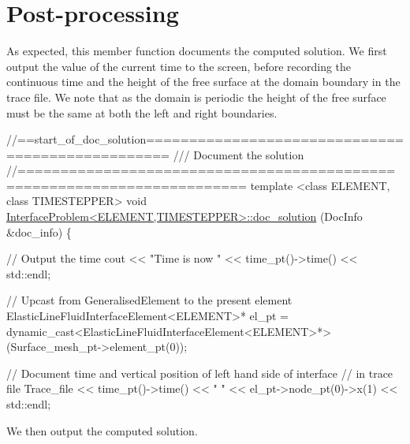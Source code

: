  

\hypertarget{index_doc}{}\section{Post-\/processing}\label{index_doc}
As expected, this member function documents the computed solution. We first output the value of the current time to the screen, before recording the continuous time and the height of the free surface at the domain boundary in the trace file. We note that as the domain is periodic the height of the free surface must be the same at both the left and right boundaries.


\begin{DoxyCodeInclude}
\textcolor{comment}{//==start\_of\_doc\_solution=================================================}
\textcolor{comment}{/// Document the solution}
\textcolor{comment}{}\textcolor{comment}{//========================================================================}
\textcolor{keyword}{template} <\textcolor{keyword}{class} ELEMENT, \textcolor{keyword}{class} TIMESTEPPER>
\textcolor{keywordtype}{void} \hyperlink{classInterfaceProblem_a49714e35e94f7d2af0b6ddd22b851f52}{InterfaceProblem<ELEMENT,TIMESTEPPER>::doc\_solution}
      (DocInfo &doc\_info)
\{ 

 \textcolor{comment}{// Output the time}
 cout << \textcolor{stringliteral}{"Time is now "} << time\_pt()->time() << std::endl;

 \textcolor{comment}{// Upcast from GeneralisedElement to the present element}
 ElasticLineFluidInterfaceElement<ELEMENT>* el\_pt = 
  \textcolor{keyword}{dynamic\_cast<}ElasticLineFluidInterfaceElement<ELEMENT>*\textcolor{keyword}{>}
  (Surface\_mesh\_pt->element\_pt(0));

 \textcolor{comment}{// Document time and vertical position of left hand side of interface}
 \textcolor{comment}{// in trace file}
 Trace\_file << time\_pt()->time() << \textcolor{stringliteral}{" "}
            << el\_pt->node\_pt(0)->x(1) << std::endl;

\end{DoxyCodeInclude}


We then output the computed solution.




